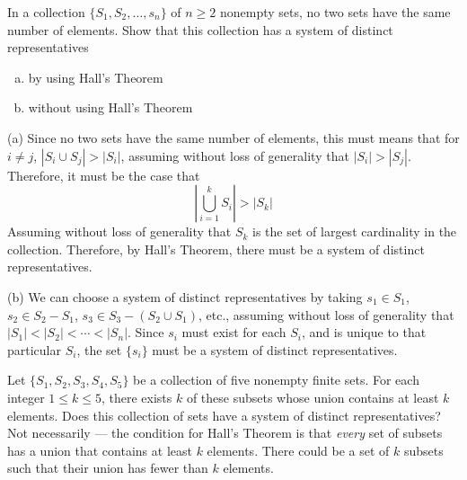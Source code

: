 \documentclass[8pt]{extarticle}
\title{}
\author{Avinash Iyer}
\date{}
\begin{document}
  \begin{problem}{3}
    In a collection $\{S_1,S_2,\dots,s_n\}$ of $n\geq 2$ nonempty sets, no two sets have the same number of elements. Show that this collection has a system of distinct representatives
    \begin{enumerate}[(a)]
      \item by using Hall's Theorem
      \item without using Hall's Theorem
    \end{enumerate}
    \tcblower
    \begin{problem}{(a)}
      Since no two sets have the same number of elements, this must means that for $i\neq j$, $|S_i \cup S_j| > |S_i|$, assuming without loss of generality that $|S_i| > |S_j|$.\\

      Therefore, it must be the case that
      \[
        \left|\bigcup_{i=1}^{k} S_i\right| > |S_k|
      \]
      Assuming without loss of generality that $S_k$ is the set of largest cardinality in the collection. Therefore, by Hall's Theorem, there must be a system of distinct representatives.
    \end{problem}
    \begin{problem}{(b)}
      We can choose a system of distinct representatives by taking $s_1\in S_1$, $s_2 \in S_2-S_1$, $s_3\in S_3 - (S_2 \cup S_1)$, etc., assuming without loss of generality that $|S_1| < |S_2| < \cdots < |S_n|$. Since $s_i$ must exist for each $S_i$, and is unique to that particular $S_i$, the set $\{s_i\}$ must be a system of distinct representatives.
    \end{problem}
  \end{problem}
  \begin{problem}{4}
    Let $\{S_1,S_2,S_3,S_4,S_5\}$ be a collection of five nonempty finite sets. For each integer $1\leq k\leq 5$, there exists $k$ of these subsets whose union contains at least $k$ elements. Does this collection of sets have a system of distinct representatives?
    \tcblower
    Not necessarily --- the condition for Hall's Theorem is that \textit{every} set of subsets has a union that contains at least $k$ elements. There could be a set of $k$ subsets such that their union has fewer than $k$ elements.
  \end{problem}
\end{document}
